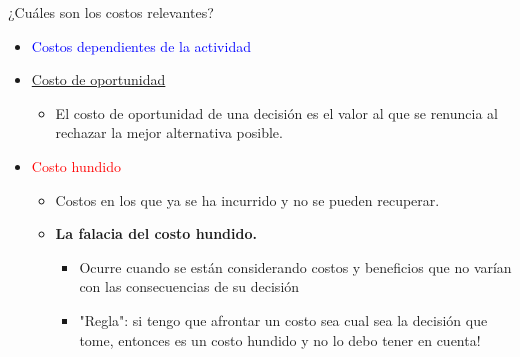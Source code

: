 \documentclass{beamer}
\begin{document}
\begin{frame}{¿Cuáles son los costos relevantes? }
    \begin{itemize}
        \item \textcolor{blue}{Costos dependientes de la actividad}
        \item \href{https://econ.video/2017/08/28/the-simpsons-opportunity-cost-of-lines/}{Costo de oportunidad}
        \begin{itemize}
        \vspace{2mm}
            \item  El costo de oportunidad de una decisión es el valor al que se renuncia al rechazar la mejor alternativa posible.
        \end{itemize}
        \vspace{2mm}
        \item \textcolor{red}{Costo hundido}
        \begin{itemize}
        \vspace{2mm}
        \item Costos en los que ya se ha incurrido y no se pueden recuperar.
        \end{itemize}
        \vspace{2mm}
        \begin{itemize}
        \item \textbf{La falacia del costo hundido.}  
            \begin{itemize}
            \item Ocurre cuando se están considerando costos y beneficios que no varían con las consecuencias de su decisión
            \item  "Regla": si tengo que afrontar un costo sea cual sea la decisión que tome, entonces es un costo hundido y no lo debo tener en cuenta!
            \end{itemize}
        \end{itemize}
    \end{itemize} 
\end{frame}
\end{document}
